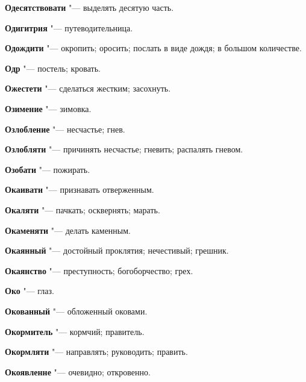 \begin{mymulticols}{2}
\noindent\textbf{Одесятствовати} "--- выделять десятую часть. 




\noindent\textbf{Одигитрия} "--- путеводительница. 




\noindent\textbf{Одождити} "--- окропить; оросить; послать в виде дождя; в большом количестве. 




\noindent\textbf{Одр} "--- постель; кровать. 




\noindent\textbf{Ожестети} "--- сделаться жестким; засохнуть. 




\noindent\textbf{Озимение} "--- зимовка. 




\noindent\textbf{Озлобление} "--- несчастье; гнев. 




\noindent\textbf{Озлобляти} "--- причинять несчастье; гневить; распалять гневом. 




\noindent\textbf{Озобати} "--- пожирать. 




\noindent\textbf{Окаивати} "--- признавать отверженным. 




\noindent\textbf{Окаляти} "--- пачкать; осквернять; марать. 




\noindent\textbf{Окаменяти} "--- делать каменным. 




\noindent\textbf{Окаянный} "--- достойный проклятия; нечестивый; грешник. 




\noindent\textbf{Окаянство} "--- преступность; богоборчество; грех. 




\noindent\textbf{Око} "--- глаз. 




\noindent\textbf{Окованный} "--- обложенный оковами. 




\noindent\textbf{Окормитель} "--- кормчий; правитель. 




\noindent\textbf{Окормляти} "--- направлять; руководить; править. 




\noindent\textbf{Окоявленне} "--- очевидно; откровенно. 





\end{mymulticols}
